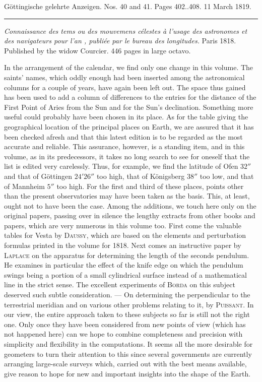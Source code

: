 \clearpage
{}
\begin{center}\small Göttingische gelehrte Anzeigen. Nos. 40 and 41. Pages 402..408. 11 March 1819.\\[3pt]\rule{.72\linewidth}{.3pt}\end{center}

\noindent\emph{Connaissance des tems ou des mouvemens célestes à l'usage des astronomes et des navigateurs pour l'an {}, publiée par le bureau des longitudes.} Paris 1818. Published by the widow Courcier. 446 pages in large octavo.

\begingroup{}\relax
In the arrangement of the calendar, we find only one change in this volume. The saints’ names, which oddly enough had been inserted among the astronomical columns for a couple of years, have again been left out. The space thus gained has been used to add a column of differences to the entries for the distance of the First Point of Aries from the Sun and for the Sun’s declination. Something more useful could probably have been chosen in its place. As for the table giving the geographical location of the principal places on Earth, we are assured that it has been checked afresh and that this latest edition is to be regarded as the most accurate and reliable. This assurance, however, is a standing item, and in this volume, as in its predecessors, it takes no long search to see for oneself that the list is edited very carelessly. Thus, for example, we find the latitude of Ofen $32''$ and that of Göttingen $24' 26''$ too high, that of Königsberg $38''$ too low, and that of Mannheim $5''$ too high. For the first and third of these places, points other than the present observatories may have been taken as the basis. This, at least, ought not to have been the case. Among the additions, we touch here only on the original papers, passing over in silence the lengthy extracts from other books and papers, which are very numerous in this volume too. First come the valuable tables for Vesta by \textsc{Daussy}, which are based on the elements and perturbation formulas printed in the volume for 1818. Next comes an instructive paper by \textsc{Laplace} on the apparatus for determining the length of the seconds pendulum. He examines in particular the effect of the knife edge on which the pendulum swings being a portion of a small cylindrical surface instead of a mathematical line in the strict sense. The excellent experiments of \textsc{Borda} on this subject deserved such subtle consideration. --- On determining the perpendicular to the terrestrial meridian and on various other problems relating to it, by \textsc{Puissant}. In our view, the entire approach taken to these subjects so far is still not the right one. Only once they have been considered from new points of view (which has not happened here) can we hope to combine completeness and precision with simplicity and flexibility in the computations. It seems all the more desirable for geometers to turn their attention to this since several governments are currently arranging large-scale surveys which, carried out with the best means available, give reason to hope for new and important insights into the shape of the Earth. 